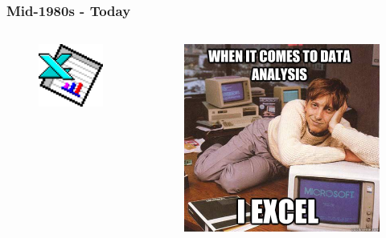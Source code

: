 \documentclass{beamer}
\begin{document}
\begin{frame}
   \frametitle{Mid-1980s - Today} 
   \begin{columns}
      \begin{column}{0.5\textwidth}
         \begin{figure}[htbp]
            \includegraphics[width=1.0\textwidth]{images/Excel_97.png}
         \end{figure}
      \end{column}
      \hfill
      \begin{column}{0.5\textwidth}
         \begin{figure}[htbp]
            \includegraphics[width=1.0\textwidth]{images/bill-excels.jpg}
         \end{figure}
      \end{column}
   \end{columns}
\end{frame}
\end{document}
